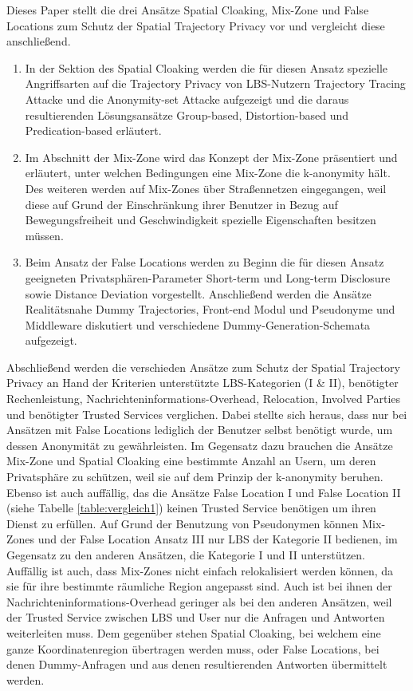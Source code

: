 Dieses Paper stellt die drei Ansätze Spatial Cloaking, Mix-Zone und False Locations zum Schutz der Spatial Trajectory Privacy vor und vergleicht diese anschließend.
\begin{enumerate}
	\item In der Sektion des Spatial Cloaking werden die für diesen Ansatz spezielle Angriffsarten auf die Trajectory Privacy von LBS-Nutzern Trajectory Tracing Attacke und die Anonymity-set Attacke aufgezeigt und die daraus resultierenden Lösungsansätze Group-based, Distortion-based und Predication-based erläutert.
	\item Im Abschnitt der Mix-Zone wird das Konzept der Mix-Zone präsentiert und erläutert, unter welchen Bedingungen eine Mix-Zone die k-anonymity hält. Des weiteren werden auf Mix-Zones über Straßennetzen eingegangen, weil diese auf Grund der Einschränkung ihrer Benutzer in Bezug auf Bewegungsfreiheit und Geschwindigkeit spezielle Eigenschaften besitzen müssen.
	\item Beim Ansatz der False Locations werden zu Beginn die für diesen Ansatz geeigneten Privatsphären-Parameter Short-term und Long-term Disclosure sowie Distance Deviation vorgestellt. Anschließend werden die Ansätze Realitätsnahe Dummy Trajectories, Front-end Modul und Pseudonyme und Middleware diskutiert und verschiedene Dummy-Generation-Schemata aufgezeigt.
\end{enumerate}
Abschließend werden die verschieden Ansätze zum Schutz der Spatial Trajectory Privacy an Hand der Kriterien unterstützte LBS-Kategorien (I \& II), benötigter Rechenleistung, Nachrichteninformations-Overhead, Relocation, Involved Parties und benötigter Trusted Services verglichen. Dabei stellte sich heraus, dass nur bei Ansätzen mit False Locations lediglich der Benutzer selbst benötigt wurde, um dessen Anonymität zu gewährleisten. Im Gegensatz dazu brauchen die Ansätze Mix-Zone und Spatial Cloaking eine bestimmte Anzahl an Usern, um deren Privatsphäre zu schützen, weil sie auf dem Prinzip der k-anonymity beruhen. Ebenso ist auch auffällig, das die Ansätze False Location I und False Location II (siehe Tabelle \ref{table:vergleich1}) keinen Trusted Service benötigen um ihren Dienst zu erfüllen. Auf Grund der Benutzung von Pseudonymen können Mix-Zones und der False Location Ansatz III nur LBS der Kategorie II bedienen, im Gegensatz zu den anderen Ansätzen, die Kategorie I und II unterstützen. Auffällig ist auch, dass Mix-Zones nicht einfach relokalisiert werden können, da sie für ihre bestimmte räumliche Region angepasst sind. Auch ist bei ihnen der Nachrichteninformations-Overhead geringer als bei den anderen Ansätzen, weil der Trusted Service zwischen LBS und User nur die Anfragen und Antworten weiterleiten muss. Dem gegenüber stehen Spatial Cloaking, bei welchem eine ganze Koordinatenregion übertragen werden muss, oder False Locations, bei denen Dummy-Anfragen und aus denen resultierenden Antworten übermittelt werden.    
